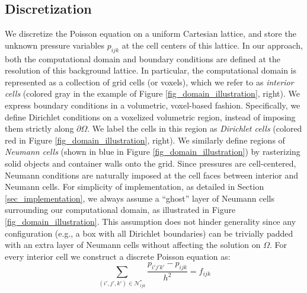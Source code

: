 \subsection{Discretization}
\label{sec_discretization}
We discretize the Poisson equation on a uniform Cartesian lattice, and store the unknown pressure variables $p_{ijk}$ at the cell centers of this lattice. In our approach, both the computational
domain and boundary conditions are defined at the resolution of this background lattice. In particular, the computational domain is represented as a collection of grid cells
(or voxels), which we refer to as \emph{interior cells} (colored gray in the example of Figure \ref{fig_domain_illustration}, right).
We express boundary conditions in a volumetric, voxel-based fashion. Specifically, we define Dirichlet conditions on a voxelized volumetric region, instead of imposing them strictly
along $\partial\Omega$. We label the cells in this region as \emph{Dirichlet cells} (colored red in Figure \ref{fig_domain_illustration}, right).
We similarly define regions of \emph{Neumann cells} (shown in blue in Figure \ref{fig_domain_illustration}) by rasterizing solid objects and container walls onto
the grid. Since pressures are cell-centered, Neumann conditions are naturally imposed at the cell faces between interior and Neumann cells. For simplicity of implementation, as
detailed in Section \ref{sec_implementation}, we always assume a ``ghost'' layer of Neumann cells surrounding our computational domain, as illustrated in Figure
\ref{fig_domain_illustration}. This assumption does not hinder generality since any configuration (e.g., a box with all Dirichlet boundaries) can be trivially padded with an extra layer of
Neumann cells without affecting the solution on $\Omega$.
For every interior cell we construct a discrete Poisson equation as:
\begin{equation}
\sum_{(i'\!,j'\!,k')\in\mathcal{N}^{\ast}_{ijk}}\!\!\!\!\!\!\!\!\frac{p_{i'\!j'\!k'}-p_{ijk}}{h^2}=f_{ijk}
\label{eqn_discrete_poisson}
\end{equation}
